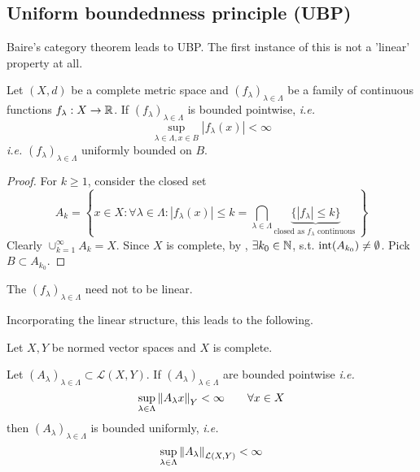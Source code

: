 \documentclass{article}
\begin{document}
\subsection{Uniform boundednness principle (UBP)}

Baire's category theorem leads to UBP. The first instance of this is not a 'linear' property at all.

\begin{theorem}
\label{uniform bounded but not linear}
    Let $(X,d)$ be a complete metric space and $(f_\lambda)_{\lambda \in \Lambda}$ be a family of continuous functions $f_{\lambda}:X \to \mathbb{R}$. If $(f_\lambda)_{\lambda \in \Lambda}$ is bounded pointwise, \textit{i.e.}  
    $$
    \sup_{\lambda \in \Lambda, x\in B} |f_{\lambda}(x)|<\infty
    $$
    \textit{i.e.} $(f_{\lambda})_{\lambda \in \Lambda}$ uniformly bounded on $B$.
\end{theorem}

\begin{proof}
    For $k\geq 1$, consider the closed set  
    $$
    A_k = \left\{x \in X: \forall \lambda \in \Lambda: |f_{\lambda}(x)|\leq k = \bigcap_{\lambda\in \Lambda} \underbrace{\{|f_{\lambda}|\leq k\}}_{\text{closed\ as\ $f_{\lambda}$\ continuous\ }}\right\}
    $$
    Clearly $\cup_{k=1}^{\infty}A_k=X$. Since $X$ is complete,  
    by , $\exists k_0 \in \mathbb{N}$, s.t. $\textrm{int} (A_{k_0})\neq \emptyset$. Pick $B\subset A_{k_0}$.
\end{proof}

\begin{remark}
    The $(f_\lambda)_{\lambda \in \Lambda}$ need not to be linear.
\end{remark}

Incorporating the linear structure, this leads to the following.  

\begin{corollary}\nl
\label{banach steinhaus}
Let $X,Y$ be normed vector spaces and $X$ is complete.  

Let $(A_\lambda)_{\lambda \in \Lambda} \subset \mathcal{L}(X,Y)$. If $(A_{\lambda})_{\lambda \in \Lambda}$ are bounded pointwise \textit{i.e.}  
$$
\sup_{\lambda \in \Lambda} \left\|{A_\lambda x}\right\|_Y < \infty \qquad \forall x\in X
$$  
then $(A_{\lambda})_{\lambda \in \Lambda}$ is bounded uniformly, \textit{i.e.}  
$$
\sup_{\lambda \in \Lambda} \left\|{A_\lambda}\right\|_{\mathcal{L}(X,Y)} < \infty
$$
\end{corollary}
\end{document}
